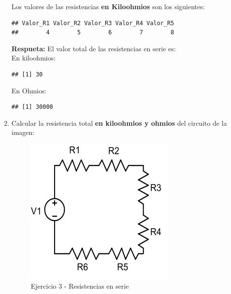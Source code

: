 \documentclass[10pt]{article}\usepackage[]{graphicx}\usepackage[]{color}
\makeatletter
\newenvironment{kframe}{%
 \def\at@end@of@kframe{}%
 \ifinner\ifhmode%
  \def\at@end@of@kframe{\end{minipage}}%
  \begin{minipage}{\columnwidth}%
 \fi\fi%
 \def\FrameCommand##1{\hskip\@totalleftmargin \hskip-\fboxsep
 \colorbox{shadecolor}{##1}\hskip-\fboxsep
     \hskip-\linewidth \hskip-\@totalleftmargin \hskip\columnwidth}%
 \MakeFramed {\advance\hsize-\width
   \@totalleftmargin\z@ \linewidth\hsize
   \@setminipage}}%
 {\par\unskip\endMakeFramed%
 \at@end@of@kframe}
\newenvironment{knitrout}{}{} %
\makeatother
\begin{document}
\begin{enumerate}
Los valores de las resistencias \textbf{en Kiloohmios}  son los siguientes:
\begin{knitrout}
\color{fgcolor}\begin{kframe}
\begin{verbatim}
## Valor_R1 Valor_R2 Valor_R3 Valor_R4 Valor_R5 
##        4        5        6        7        8
\end{verbatim}
\end{kframe}
\end{knitrout}

\textbf{Respueta: }El valor total de las resistencias en serie es:\\
En kiloohmios:
\begin{knitrout}
\color{fgcolor}\begin{kframe}
\begin{verbatim}
## [1] 30
\end{verbatim}
\end{kframe}
\end{knitrout}
En Ohmios:
\begin{knitrout}
\color{fgcolor}\begin{kframe}
\begin{verbatim}
## [1] 30000
\end{verbatim}
\end{kframe}
\end{knitrout}


\item Calcular la resistencia total \textbf{en kiloohmios y ohmios} del circuito de la imagen:\\

\begin{figure}[h!] %
	\centering
		\includegraphics[scale=1.9]{Imagenes/cap1_ej3_res_serie.png}   
	\caption{Ejercicio 3 - Resistencias en serie} \label{fig:cap1_ej3_res_serie.png}
\end{figure}


\end{enumerate}
\end{document}
